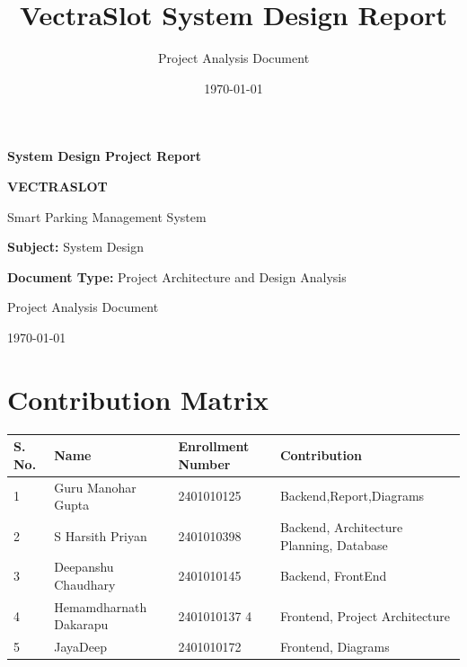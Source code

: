 \documentclass[12pt,a4paper]{article}
\title{\textbf{VectraSlot System Design Report}}
\author{Project Analysis Document}
\date{\today}
\begin{document}
\begin{titlepage}
    \centering
    \vspace*{2.5cm}

    {\Large \textbf{System Design Project Report}\par}
    \vspace{1.25cm}

    {\huge \textbf{VECTRASLOT}\par}
    \vspace{0.5cm}

    {\Large Smart Parking Management System\par}
    \vspace{2cm}

    {\large \textbf{Subject:} System Design\par}
    \vspace{0.6cm}

    {\large \textbf{Document Type:} Project Architecture and Design Analysis\par}
    \vspace{2.2cm}

    {\large Project Analysis Document\par}
    \vfill

    {\large \today\par}
\end{titlepage}

\tableofcontents
\newpage

\section{Contribution Matrix}
\begin{longtable}{p{} p{} p{} p{}}
\toprule
\textbf{S. No.} & \textbf{Name} & \textbf{Enrollment Number} & \textbf{Contribution} \\
\midrule
1 & Guru Manohar Gupta & 2401010125 & Backend,Report,Diagrams \\
2 & S Harsith Priyan & 2401010398 & Backend, Architecture Planning, Database \\
3 & Deepanshu Chaudhary & 2401010145 & Backend, FrontEnd \\
4 & Hemamdharnath Dakarapu & 2401010137 4 & Frontend, Project Architecture \\
5 & JayaDeep & 2401010172 & Frontend, Diagrams \\
\bottomrule
\end{longtable}
\end{document}
